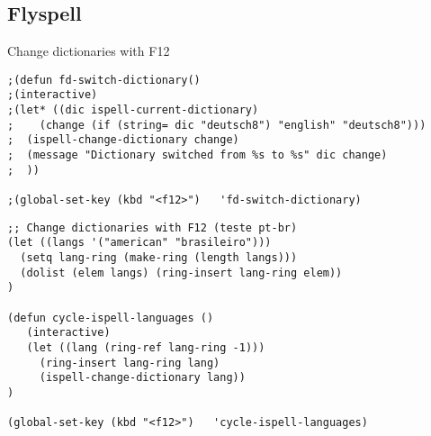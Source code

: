 \documentclass[11pt]{article}
\begin{document}
\subsection*{Flyspell}
\label{sec:org11e4c08}

Change dictionaries with F12

\begin{verbatim}
;(defun fd-switch-dictionary()
;(interactive)
;(let* ((dic ispell-current-dictionary)
;    (change (if (string= dic "deutsch8") "english" "deutsch8")))
;  (ispell-change-dictionary change)
;  (message "Dictionary switched from %s to %s" dic change)
;  ))

;(global-set-key (kbd "<f12>")   'fd-switch-dictionary)
\end{verbatim}

\begin{verbatim}
;; Change dictionaries with F12 (teste pt-br)
(let ((langs '("american" "brasileiro")))
  (setq lang-ring (make-ring (length langs)))
  (dolist (elem langs) (ring-insert lang-ring elem))
)

(defun cycle-ispell-languages ()
   (interactive)
   (let ((lang (ring-ref lang-ring -1)))
     (ring-insert lang-ring lang)
     (ispell-change-dictionary lang))
)

(global-set-key (kbd "<f12>")   'cycle-ispell-languages)
\end{verbatim}
\end{document}
